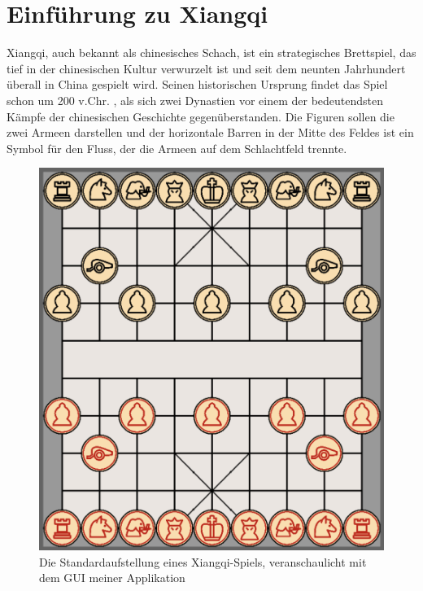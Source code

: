 \documentclass{jpp}
\begin{document}
\section{Einführung zu Xiangqi}\label{sec:introtoxiangqi}
Xiangqi, auch bekannt als chinesisches Schach, ist ein strategisches Brettspiel, das tief in der chinesischen Kultur verwurzelt ist und seit dem neunten Jahrhundert überall in China gespielt wird. Seinen historischen Ursprung findet das Spiel schon um 200 v.Chr. , als sich zwei Dynastien vor einem der bedeutendsten Kämpfe der chinesischen Geschichte gegenüberstanden. Die Figuren sollen die zwei Armeen darstellen und der horizontale Barren in der Mitte des Feldes ist ein Symbol für den Fluss, der die Armeen auf dem Schlachtfeld trennte. 
\begin{figure}
  \centering
  \begin{minipage}{0.49\textwidth}
    \includegraphics[width=\textwidth]{imgs/board.png}
    \caption{Die Standardaufstellung eines Xiangqi-Spiels, veranschaulicht mit dem GUI meiner Applikation}
    \label{fig:board}
  \end{minipage}
  \hfill
  \begin{minipage}{0.49\textwidth}

\end{minipage}
\end{figure}
\end{document}
